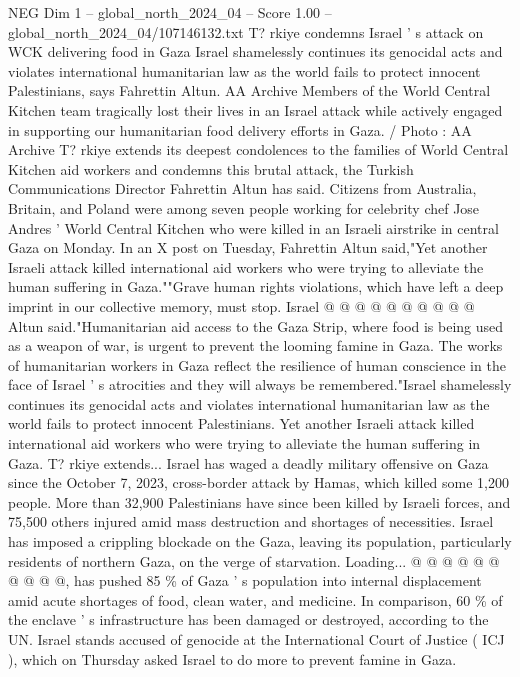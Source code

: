 \begin{textsample}{NEG Dim 1 – global\_north\_2024\_04 – Score 1.00 – global\_north\_2024\_04/107146132.txt}  \label{ex:f1_neg_304}
T? rkiye condemns Israel ' s attack on WCK delivering food in Gaza Israel shamelessly continues its genocidal acts and violates international humanitarian law as the world fails to protect innocent Palestinians, says Fahrettin Altun.
AA Archive Members of the World Central Kitchen team tragically lost their lives in an Israel attack while actively engaged in supporting our humanitarian food delivery efforts in Gaza. / Photo : AA Archive T? rkiye extends its deepest condolences to the families of World Central Kitchen aid workers and condemns this brutal attack, the Turkish Communications Director Fahrettin Altun has said.
Citizens from Australia, Britain, and Poland were among seven people working for celebrity chef Jose Andres ' World Central Kitchen who were killed in an Israeli airstrike in central Gaza on Monday.
In an X post on Tuesday, Fahrettin Altun said,"Yet another Israeli attack killed international aid workers who were trying to alleviate the human suffering in Gaza.""Grave human rights violations, which have left a deep imprint in our collective memory, must stop.
Israel @ @ @ @ @ @ @ @ @ @ Altun said."Humanitarian aid access to the Gaza Strip, where food is being used as a weapon of war, is urgent to prevent the looming famine in Gaza.
The works of humanitarian workers in Gaza reflect the resilience of human conscience in the face of Israel ' s atrocities and they will always be remembered."Israel shamelessly continues its genocidal acts and violates international humanitarian law as the world fails to protect innocent Palestinians.
Yet another Israeli attack killed international aid workers who were trying to alleviate the human suffering in Gaza.
T? rkiye extends...
Israel has waged a deadly military offensive on Gaza since the October 7, 2023, cross-border attack by Hamas, which killed some 1,200 people.
More than 32,900 Palestinians have since been killed by Israeli forces, and 75,500 others injured amid mass destruction and shortages of necessities.
Israel has imposed a crippling blockade on the Gaza, leaving its population, particularly residents of northern Gaza, on the verge of starvation.
Loading... @ @ @ @ @ @ @ @ @ @, has pushed 85 \% of Gaza ' s population into internal displacement amid acute shortages of food, clean water, and medicine.
In comparison, 60 \% of the enclave ' s infrastructure has been damaged or destroyed, according to the UN.
Israel stands accused of genocide at the International Court of Justice ( ICJ ), which on Thursday asked Israel to do more to prevent famine in Gaza.

\end{textsample}
